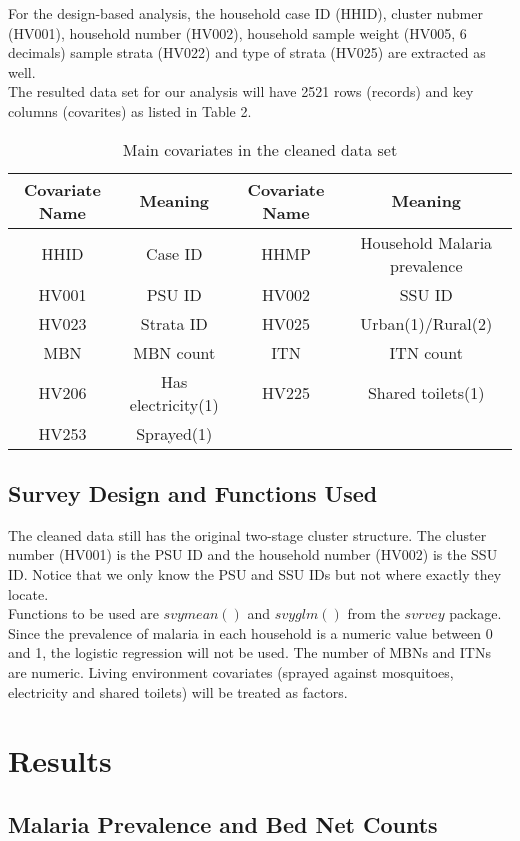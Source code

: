 \documentclass[11pt]{article}
\begin{document}
For the design-based analysis, the household case ID (HHID), cluster nubmer (HV001), household number (HV002), household sample weight (HV005, 6 decimals) sample strata (HV022) and type of strata (HV025) are extracted as well.  \\
The resulted data set for our analysis will have 2521 rows (records) and key columns (covarites) as listed in Table 2.
\begin{table}[h]
\centering
\small
 \begin{tabular}{c c || c c} 
 Covariate Name & Meaning &  Covariate Name & Meaning\\ 
 \hline
 HHID & Case ID & HHMP & Household Malaria prevalence \\
 HV001 & PSU ID & HV002 & SSU ID \\
 HV023 & Strata ID & HV025 & Urban(1)/Rural(2) \\
 MBN & MBN count & ITN & ITN count \\
 HV206 & Has electricity(1) & HV225 & Shared toilets(1) \\
 HV253 & Sprayed(1) & &
\end{tabular}
\caption{Main covariates in the cleaned data set}
\label{tab:abc}
\end{table}

\subsection{Survey Design and Functions Used}

The cleaned data still has the original two-stage cluster structure. The cluster number (HV001) is the PSU ID and the household number (HV002) is the SSU ID. Notice that we only know the PSU and SSU IDs but not where exactly they locate. \\
Functions to be used are $svymean()$ and $svyglm()$ from the $svrvey$ package. Since the prevalence of malaria in each household is a numeric value between 0 and 1, the logistic regression will not be used. The number of MBNs and ITNs are numeric. Living environment covariates (sprayed against mosquitoes, electricity and shared toilets) will be treated as factors.   

\section{Results}

\subsection{Malaria Prevalence and Bed Net Counts}
\end{document}
